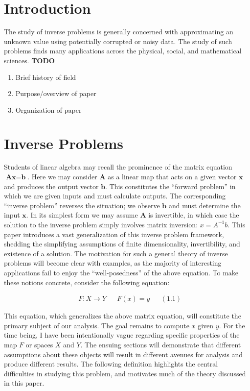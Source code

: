 \documentclass[12pt]{amsart}
\begin{document}
\section{Introduction} 
The study of inverse problems is generally concerned with approximating an unknown value using potentially corrupted or noisy data. The study of such problems finds many applications across the physical, social, and mathematical sciences. 
\textbf{TODO}
\begin{enumerate} 
\item Brief history of field
\item Purpose/overview of paper
\item Organization of paper
\end{enumerate} 

\section{Inverse Problems}
Students of linear algebra may recall the prominence of the matrix equation $\textbf{Ax} = \textbf{b}$. Here we may consider $\textbf{A}$ as a linear map that acts on a given vector $\textbf{x}$ and produces the output vector $\textbf{b}$. This constitutes the ``forward problem'' in which we are given inputs and must calculate outputs. The corresponding ``inverse problem'' reverses the situation; we observe $\textbf{b}$ and must determine the input $\textbf{x}$. In its simplest form we may assume $\textbf{A}$ is invertible, in which case the solution to the inverse problem simply involves matrix inversion: $x = A^{-1}b$. This paper introduces a vast generalization of this inverse problem framework, shedding the simplifying assumptions of finite dimensionality, invertibility, and existence of a solution. The motivation for such a general theory of inverse problems will become clear with examples, as the majority of interesting applications fail to enjoy the ``well-posedness'' of the above equation. To make these notions concrete, consider the following equation:

\begin{align*} 
&F: X \to Y && F(x) = y && (1.1)
\end{align*} 

This equation, which generalizes the above matrix equation, will constitute the primary subject of our analysis. The goal remains to compute $x$ given $y$. For the time being, I have been intentionally vague regarding specific properties of the map $F$ or spaces $X$ and $Y$. The ensuing sections will demonstrate that different assumptions about these objects will result in different avenues for analysis and produce different results. The following definition highlights the central difficulties in studying this problem, and motivates much of the theory discussed in this paper. \\
\end{document}
